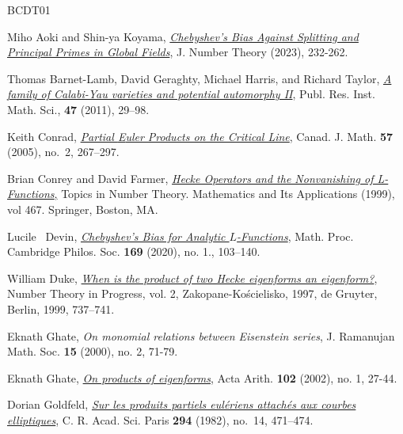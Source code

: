 \documentclass[12pt,reqno]{amsart}
\theoremstyle{definition}
\numberwithin{equation}{section}
\begin{document}
\begin{thebibliography}{BCDT01}

Miho Aoki and Shin-ya Koyama, \emph{\href{https://doi.org/10.1016/j.jnt.2022.10.005}{Chebyshev's Bias
  Against Splitting and Principal Primes in Global Fields}},  J. Number Theory (2023), 232-262. 

Thomas Barnet-Lamb, David Geraghty, Michael Harris, and Richard Taylor, \href{https://ems.press/journals/prims/articles/4468} {\emph{A family of Calabi-Yau varieties and potential
automorphy II}}, Publ. Res. Inst. Math. Sci., \textbf{47} (2011), 29–98. 

Keith Conrad, \emph{\href{https://doi.org/10.4153/CJM-2005-012-6}{Partial
  {E}uler Products on the Critical Line}}, Canad. J. Math.
  \textbf{57} (2005), no.~2, 267--297.

 Brian Conrey and David Farmer, \href{https://link.springer.com/chapter/10.1007/978-1-4613-0305-3_8} {\emph{Hecke Operators and the Nonvanishing of L-Functions},}  Topics in Number Theory. Mathematics and Its Applications (1999), vol 467. Springer, Boston, MA.


Lucile ~Devin, \emph{\href{https://doi.org/10.1017/s0305004119000100}{Chebyshev's Bias for
  Analytic {$L$}-Functions}},
 Math. Proc. Cambridge Philos. Soc. \textbf{169} (2020), no. 1., 103--140.



William Duke, \href{https://www.math.ucla.edu/~wdduke/preprints/when.pdf} {\emph{When is the product of two Hecke eigenforms an eigenform?}}, Number Theory in
Progress, vol. 2, Zakopane-Kościelisko, 1997, de Gruyter, Berlin, 1999, 737–741.

Eknath Ghate, \emph{On monomial relations between Eisenstein series}, J. Ramanujan Math. Soc. \textbf{15} (2000), no. 2, 71-79. 

Eknath Ghate, \href{https://eudml.org/doc/278621} {\emph{On products of eigenforms}},  Acta Arith. \textbf{102} (2002), no. 1, 27-44. 

Dorian Goldfeld,
  \emph{\href{https://gallica.bnf.fr/ark:/12148/bpt6k55329490/f15.image.r=Sur\%20les\%20produits\%20euleriens}{Sur
  les produits partiels eul\'{e}riens attach\'{e}s aux courbes elliptiques}},
   C. R. Acad. Sci. Paris
  \textbf{294} (1982), no.~14, 471--474. 


\end{thebibliography}
\end{document}
